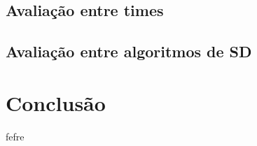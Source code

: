 \documentclass{article}
\begin{document}
\subsection{Avaliação entre times}

\subsection{Avaliação entre algoritmos de SD}

\section{Conclusão}

fefre

\newpage

\renewcommand{\refname}{Referências Bibliográficas}

\nocite{*}
\end{document}
